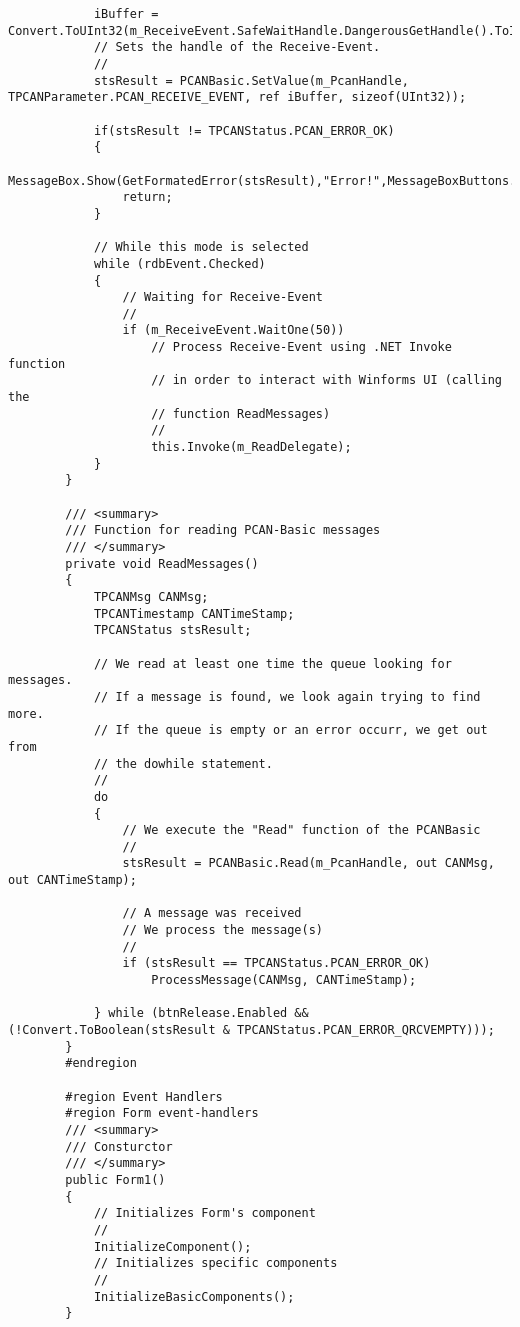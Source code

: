 \begin{lstlisting}
            iBuffer = Convert.ToUInt32(m_ReceiveEvent.SafeWaitHandle.DangerousGetHandle().ToInt32());
            // Sets the handle of the Receive-Event.
            //
            stsResult = PCANBasic.SetValue(m_PcanHandle, TPCANParameter.PCAN_RECEIVE_EVENT, ref iBuffer, sizeof(UInt32));

            if(stsResult != TPCANStatus.PCAN_ERROR_OK)
		    {
			    MessageBox.Show(GetFormatedError(stsResult),"Error!",MessageBoxButtons.OK,MessageBoxIcon.Error);
			    return;
		    }

            // While this mode is selected
            while (rdbEvent.Checked)
            {
                // Waiting for Receive-Event
                //
                if (m_ReceiveEvent.WaitOne(50))
                    // Process Receive-Event using .NET Invoke function
                    // in order to interact with Winforms UI (calling the
                    // function ReadMessages)
                    //
                    this.Invoke(m_ReadDelegate);
            }
        }

        /// <summary>
        /// Function for reading PCAN-Basic messages
        /// </summary>
        private void ReadMessages()
        {
            TPCANMsg CANMsg;
            TPCANTimestamp CANTimeStamp;
            TPCANStatus stsResult;

            // We read at least one time the queue looking for messages.
            // If a message is found, we look again trying to find more.
            // If the queue is empty or an error occurr, we get out from
            // the dowhile statement.
            //
            do
            {
                // We execute the "Read" function of the PCANBasic
                //
                stsResult = PCANBasic.Read(m_PcanHandle, out CANMsg, out CANTimeStamp);

                // A message was received
                // We process the message(s)
                //
                if (stsResult == TPCANStatus.PCAN_ERROR_OK)
                    ProcessMessage(CANMsg, CANTimeStamp);

            } while (btnRelease.Enabled && (!Convert.ToBoolean(stsResult & TPCANStatus.PCAN_ERROR_QRCVEMPTY)));
        }
        #endregion

        #region Event Handlers
        #region Form event-handlers
        /// <summary>
        /// Consturctor
        /// </summary>
        public Form1()
        {
            // Initializes Form's component
            //
            InitializeComponent();
            // Initializes specific components
            //
            InitializeBasicComponents();
        }


\end{lstlisting}
